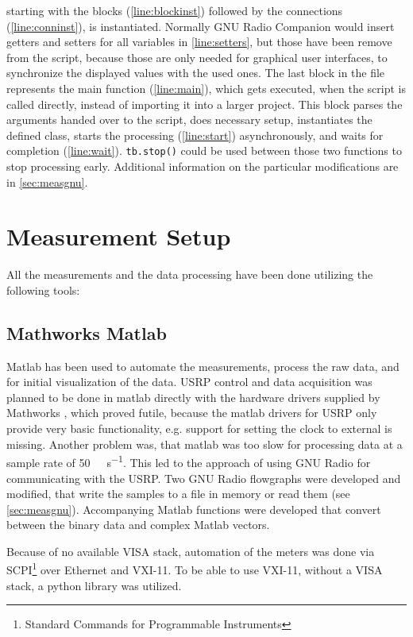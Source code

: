 \documentclass[12pt,a4paper,parskip=full,abstracton]{scrartcl}
\begin{document}
starting with the blocks (\cref{line:blockinst}) followed by the connections
(\cref{line:conninst}), is instantiated. Normally GNU Radio Companion would insert
getters and setters for all variables in \cref{line:setters}, but those have been
remove from the script, because those are only needed for graphical user interfaces,
to synchronize the displayed values with the used ones. The last block in the file
represents the main function (\cref{line:main}), which gets executed, when the script
is called directly, instead of importing it into a larger project. This block parses
the arguments handed over to the script, does necessary setup, instantiates
the defined class, starts the processing (\cref{line:start}) asynchronously, and waits for completion
(\cref{line:wait}). \lstinline{tb.stop()} could be used between those two functions to
stop processing early. Additional information on the particular modifications are in
\cref{sec:measgnu}.
\section{Measurement Setup}
All the measurements and the data processing have been done utilizing the following tools:
\subsection{Mathworks Matlab}
Matlab has been used to automate the measurements, process the raw data, and for
initial visualization of the data. USRP control and data acquisition was planned to
be done in matlab directly with the hardware drivers supplied by Mathworks \cite{matlab_usrp},
which proved futile, because the matlab drivers for
USRP only provide very basic functionality, e.g. support for setting the clock to
external is missing. Another problem was, that matlab was too slow for processing
data at a sample rate of \SI{50}{\mega\samples\per\second}. This led to the approach of
using GNU Radio for communicating with the USRP. Two GNU Radio flowgraphs were
developed and modified, that write the samples to a file in memory or read them
(see \cref{sec:measgnu}). Accompanying Matlab functions were developed that convert
between the binary data and complex Matlab vectors.

Because of no available VISA stack, automation of the meters was done via
SCPI\footnote{Standard Commands for Programmable Instruments} over Ethernet and VXI-11.
To be able to use VXI-11, without a VISA stack, a python library \cite{yamamoto_vxi-11} was
utilized.
\end{document}
